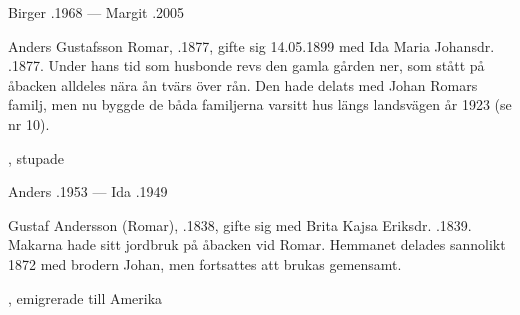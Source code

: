 Birger .1968  ---  Margit .2005


%
Anders Gustafsson Romar, .1877, gifte sig 14.05.1899 med Ida Maria Johansdr. .1877. Under hans tid som husbonde revs den gamla gården ner, som stått på åbacken alldeles nära ån tvärs över rån. Den hade delats med Johan Romars familj, men nu byggde de båda familjerna varsitt hus längs landsvägen år 1923 (se nr 10).
\begin{jhchildren}
  \item {}
  \item {}
  \item {}
  \item {}, stupade
  \item {}
  \item {}
\end{jhchildren}

Anders .1953  ---  Ida .1949



%



%
Gustaf Andersson (Romar), .1838, gifte sig med Brita Kajsa Eriksdr. .1839. Makarna hade sitt jordbruk på åbacken vid Romar. Hemmanet delades sannolikt 1872 med brodern Johan, men fortsattes att brukas gemensamt.
\begin{jhchildren}
  \item {}, emigrerade till Amerika
  \item {}
  \item {}
\end{jhchildren}

